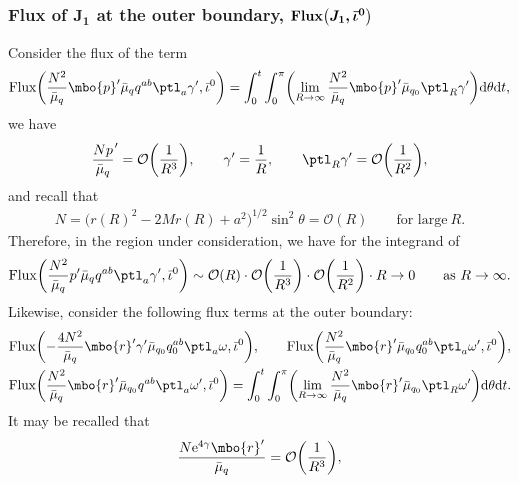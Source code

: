 \subsubsection*{Flux of $\boldsymbol{J_1}$ at the outer boundary, $\boldsymbol{{\rm Flux} \bigl(J_1, \bar{\iota}^0\bigr)}$}
 Consider the flux of the term
\begin{align*}
{\rm Flux} \biggl(\frac{N^2}{ \bar{\mu}_q} \mbo{p}' \bar{\mu}_q q^{ab} \ptl_a \gamma', \bar{\iota}^0 \biggr) = \int^t_0 \int^\pi_0 \biggl(\lim_{R \to \infty} \frac{N^2}{ \bar{\mu}_q} \mbo{p}' \bar{\mu}_{q_0} \ptl_R \gamma' \biggr) {\rm d}\theta {\rm d}t,
\end{align*}
we have
\begin{align*}
\frac{N p}{\bar{\mu}_q}' = \mathcal{O} \biggl(\frac{1}{R^3} \biggr), \qquad \gamma' = \frac{1}{R}, \qquad \ptl_R \gamma' = \mathcal{O} \biggl(\frac{1}{R^2} \biggr),
\end{align*}
and recall that
\begin{align*}
N = \bigl(r(R)^2 - 2Mr(R) + a^2\bigr)^{1/2} \sin^2 \theta = \mathcal{O}(R) \qquad \text{for large} \ R.
\end{align*}
Therefore, in the region under consideration, we have for the integrand of
\[
{\rm Flux} \biggl(\frac{N^2}{ \bar{\mu}_q} p' \bar{\mu}_q q^{ab} \ptl_a \gamma', \bar{\iota}^0 \biggr) \sim \mathcal{O}(R) \cdot \mathcal{O} \biggl(\frac{1}{R^3}\biggr) \cdot \mathcal{O} \biggl(\frac{1}{R^2}\biggr) \cdot R \to 0 \qquad\text{as}\ R \to \infty.
\]
Likewise, consider the following flux terms at the outer boundary:
\begin{align*}
&{\rm Flux} \biggl(-\frac{4 N^2}{\bar{\mu}_q} \mbo{r}' \gamma' \bar{\mu}_{q_0} q_0^{ab} \ptl_a \omega, \bar{\iota}^0 \biggr), \qquad {\rm Flux} \biggl(\frac{N^2}{\bar{\mu}_q} \mbo{r}' \bar{\mu}_{q_0} q_0^{ab} \ptl_a \omega', \bar{\iota}^0 \biggr),
\\
&{\rm Flux} \biggl(\frac{N^2}{\bar{\mu}_q} \mbo{r}' \bar{\mu}_{q_0} q^{ab} \ptl_a \omega', \bar{\iota}^0 \biggr) = \int^t_0 \int^\pi_0 \biggl( \lim_{R \to \infty} \frac{N^2}{\bar{\mu}_q} \mbo{r}' \bar{\mu}_{q_0} \ptl_R \omega' \biggr) {\rm d} \theta {\rm d}t.
\end{align*}
It may be recalled that
\begin{align*}
\frac{N {\rm e}^{4 \gamma} \mbo{r}'}{\bar{\mu}_q} = \mathcal{O} \biggl(\frac{1}{R^3} \biggr),
\end{align*}
